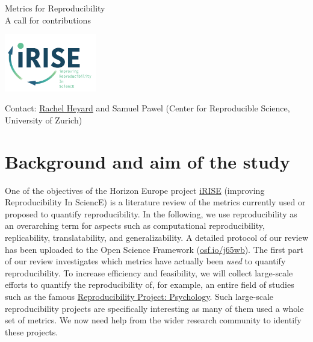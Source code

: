 \documentclass[a4paper,10.5pt]{report}
\begin{document}
\thispagestyle{empty}

\begin{minipage}{0.75\textwidth}
{\Huge \textcolor{iRISEblue}{Metrics for Reproducibility}}\\[.75ex]
{\Large \textcolor{iRISEblue}{A call for contributions}}\\[1ex]
\end{minipage}
\begin{minipage}{0.25\textwidth}
    \vspace{-1.25cm}
    \flushright
    \includegraphics[height=2.5cm]{../misc/iRISE-lightlogo.png}
\end{minipage}
{\footnotesize Contact: \href{mailto:rachel.heyard@uzh.ch}{Rachel Heyard} and Samuel Pawel (Center for Reproducible Science, University of Zurich)}

\section*{Background and aim of the study}
One of the objectives of the Horizon Europe project \href{https://irise-project.eu/}{iRISE} (improving Reproducibility In SciencE) is a literature review of the metrics currently used or proposed to quantify reproducibility. In the following, we use reproducibility as an overarching term for aspects such as computational reproducibility, replicability, translatability, and generalizability. A detailed protocol of our review has been uploaded to the Open Science Framework (\href{https://osf.io/j65wb}{osf.io/j65wb}). The first part of our review investigates which metrics have actually been \emph{used} to quantify reproducibility. To increase efficiency and feasibility, we will collect large-scale efforts to quantify the reproducibility of, for example, an entire field of studies such as the famous \href{https://doi.org/10.1126/science.aac4716}{Reproducibility Project: Psychology}. Such large-scale reproducibility projects are specifically interesting as many of them used a whole set of metrics. We now need help from the wider research community to identify these projects.
\end{document}
